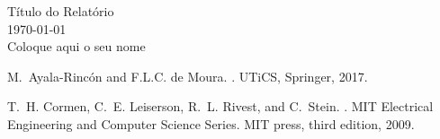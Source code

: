 \documentclass[12pt]{article}
\begin{document}

\begin{center}
  \Large Título do Relatório \\ 
  \normalsize \today \\ 
  Coloque aqui o seu nome
\end{center}




\begin{thebibliography}{CLRS01}  
M.~Ayala-Rinc\'on and F.L.C. de Moura.
.
\newblock UTiCS, Springer, 2017.

T.~H. Cormen, C.~E. Leiserson, R.~L. Rivest, and C.~Stein.
.
\newblock MIT Electrical Engineering and Computer Science Series. MIT press,
  third edition, 2009.
\end{thebibliography}
\end{document}

